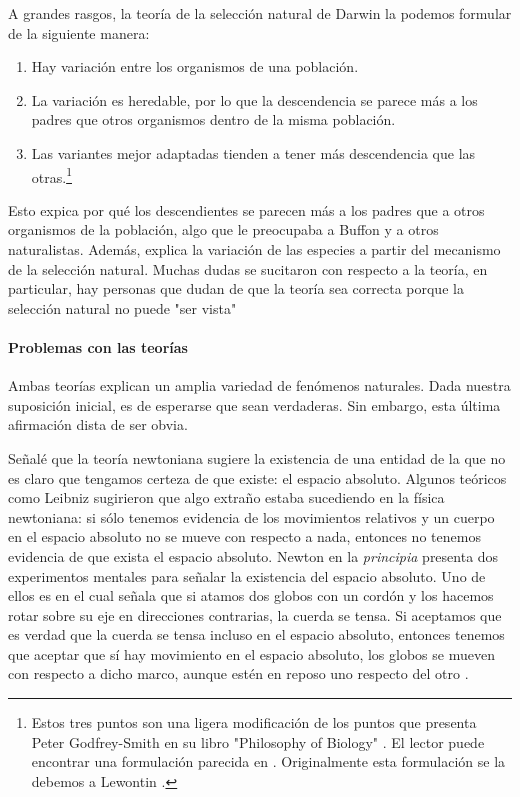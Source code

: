 A grandes rasgos, la teoría de la selección natural de Darwin la podemos formular de la siguiente manera:

\begin{enumerate}
    \item Hay variación entre los organismos de una población.
    \item La variación es heredable, por lo que la descendencia se parece más a los padres que otros organismos dentro de la misma población.
    \item Las variantes mejor adaptadas tienden a tener más descendencia que las otras.\footnote{Estos tres puntos son una ligera modificación de los puntos que presenta Peter Godfrey-Smith en su libro "Philosophy of Biology" \parencite[][p. 30]{godfrey-smith2014}. El lector puede encontrar una formulación parecida en \parencite{lloyd1988}. Originalmente esta formulación se la debemos a Lewontin \parencite[][]{lewontin1970}.}
\end{enumerate}



Esto expica por qué los descendientes se parecen más a los padres que a otros organismos de la población, algo que le preocupaba a Buffon \parencite{buffon1885} y a otros naturalistas.
Además, explica la variación de las especies a partir del mecanismo de la selección natural.
Muchas dudas se sucitaron con respecto a la teoría, en particular, hay personas que dudan de que la teoría sea correcta porque la selección natural no puede "ser vista"

\paragraph{Problemas con las teorías}

Ambas teorías explican un amplia variedad de fenómenos naturales.
Dada nuestra suposición inicial, es de esperarse que sean verdaderas.
Sin embargo, esta última afirmación dista de ser obvia.

Señalé que la teoría newtoniana sugiere la existencia de una entidad de la que no es claro que tengamos certeza de que existe: el espacio absoluto. 
Algunos teóricos como Leibniz sugirieron que algo extraño estaba sucediendo en la física newtoniana: si sólo tenemos evidencia de los movimientos relativos y un cuerpo en el espacio absoluto no se mueve con respecto a nada, entonces no tenemos evidencia de que exista el espacio absoluto. 
Newton en la \emph{principia} presenta dos experimentos mentales para señalar la existencia del espacio absoluto.
Uno de ellos es en el cual señala que si atamos dos globos con un cordón y los hacemos rotar sobre su eje en direcciones contrarias, la cuerda se tensa.
Si aceptamos que es verdad que la cuerda se tensa incluso en el espacio absoluto, entonces tenemos que aceptar que sí hay movimiento en el espacio absoluto, los globos se mueven con respecto a dicho marco, aunque estén en reposo uno respecto del otro \parencite[][pp. 6-12]{newton1966}.

